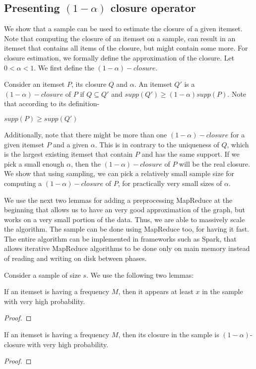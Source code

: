 \subsection{Presenting $(1-\alpha)$ closure operator}
We show that a sample can be used to estimate the closure of
a given itemset. Note that computing the closure of an
itemset on a sample, can result in an itemset that contains
all items of the closure, but might contain some more.
For closure estimation, we formally define the
approximation of the closure. Let $0 < \alpha < 1$. We first define the $(1-\alpha)-closure$.

Consider an itemset $P$, its closure $Q$ and $\alpha$. An
itemset $Q'$ is a $(1-\alpha)-closure$ of $P$ if $Q
\subseteq Q'$ and $supp(Q')\geq (1-\alpha)supp(P)$. Note
that according to its definition-
\begin{center}
$supp(P)\geq supp(Q')$
\end{center}
Additionally, note that there might be more than one
$(1-\alpha)-closure$ for a given itemset $P$ and a given
$\alpha$. This is in contrary to the uniqueness of $Q$,
which is the largest existing itemset that contain $P$ and
has the same support.
If we pick a small enough $\alpha$, then the
$(1-\alpha)-closure$ of $P$ will be the real closure. We
show that using sampling, we can pick a relatively small
sample size for computing a $(1-\alpha)-closure$ of $P$, for
practically very small sizes of $\alpha$.

We use the next two lemmas for adding a preprocessing
MapReduce at the beginning that allows us to have an very
good approximation of the graph, but works on a very small
portion of the data. Thus, we are able to massively scale
the algorithm. The sample can be done using MapReduce too,
for having it fast. The entire algorithm can be implemented
in frameworks such as Spark, that allows iterative MapReduce algorithms to be
done only on main memory instead of reading and writing on
disk between phases.

Consider a sample of size $s$. We use the following two
lemmas:
\begin{lemma}
If an itemset is having a frequency $M$, then it
appears at least $x$ in the sample with very high probability.
\end{lemma}
\begin{proof}
\end{proof}
\begin{lemma} 
If an itemset is having a frequency
$M$, then its closure in the sample is $(1-\alpha)$-closure with very
 high probability.
\end{lemma}
\begin{proof}
\end{proof}

